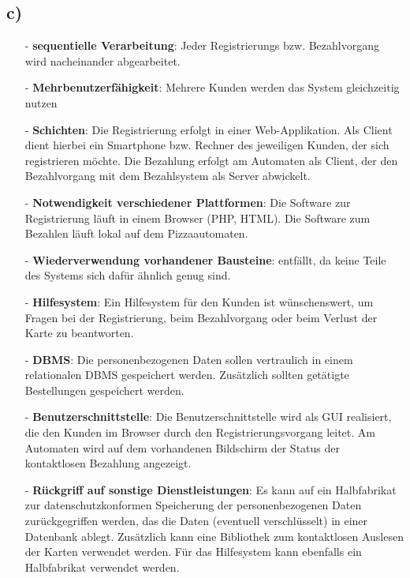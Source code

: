 \subsection*{c)}
\begin{itemize}
\item[-] \textbf{sequentielle Verarbeitung}: Jeder Registrierungs bzw. Bezahlvorgang wird nacheinander abgearbeitet.
\item[-] \textbf{Mehrbenutzerfähigkeit}: Mehrere Kunden werden das System gleichzeitig nutzen
\item[-] \textbf{Schichten}: Die Registrierung erfolgt in einer Web-Applikation. Als Client dient hierbei ein Smartphone bzw. Rechner des jeweiligen Kunden, der sich registrieren möchte. Die Bezahlung erfolgt am Automaten als Client, der den Bezahlvorgang mit dem Bezahlsystem als Server abwickelt.
\item[-] \textbf{Notwendigkeit verschiedener Plattformen}: Die Software zur Registrierung läuft in einem Browser (PHP, HTML). Die Software zum Bezahlen läuft lokal auf dem Pizzaautomaten.
\item[-] \textbf{Wiederverwendung vorhandener Bausteine}: entfällt, da keine Teile des Systems sich dafür ähnlich genug sind.
\item[-] \textbf{Hilfesystem}: Ein Hilfesystem für den Kunden ist wünschenswert, um Fragen bei der Registrierung, beim Bezahlvorgang oder beim Verlust der Karte zu beantworten.\\
\item[-] \textbf{DBMS}: Die personenbezogenen Daten sollen vertraulich in einem relationalen DBMS gespeichert werden. Zusätzlich sollten getätigte Bestellungen gespeichert werden. 
\item[-] \textbf{Benutzerschnittstelle}: Die Benutzerschnittstelle wird als GUI realisiert, die den Kunden im Browser durch den Registrierungsvorgang leitet. Am Automaten wird auf dem vorhandenen Bildschirm der Status der kontaktlosen Bezahlung angezeigt.
\item[-] \textbf{Rückgriff auf sonstige Dienstleistungen}: Es kann auf ein Halbfabrikat zur datenschutzkonformen Speicherung der personenbezogenen Daten zurückgegriffen werden, das die Daten (eventuell verschlüsselt) in einer Datenbank ablegt. Zusätzlich kann eine Bibliothek zum kontaktlosen Auslesen der Karten verwendet werden. Für das Hilfesystem kann ebenfalls ein Halbfabrikat verwendet werden.
\end{itemize}

